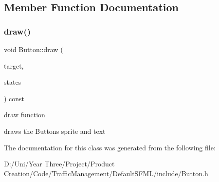 \subsection{Member Function Documentation}
\hypertarget{class_button_ada7ed6bfd73ec8704a5d2247c28f6513}{}\label{class_button_ada7ed6bfd73ec8704a5d2247c28f6513} 
\subsubsection{\texorpdfstring{draw()}{draw()}}
{\footnotesize\ttfamily void Button\+::draw (\begin{DoxyParamCaption}\item[{Render\+Target \&}]{target,  }\item[{Render\+States}]{states }\end{DoxyParamCaption}) const}



draw function 

draws the Buttons sprite and text 

The documentation for this class was generated from the following file\+:\begin{DoxyCompactItemize}
\item 
D\+:/\+Uni/\+Year Three/\+Project/\+Product Creation/\+Code/\+Traffic\+Management/\+Default\+S\+F\+M\+L/include/Button.\+h\end{DoxyCompactItemize}
